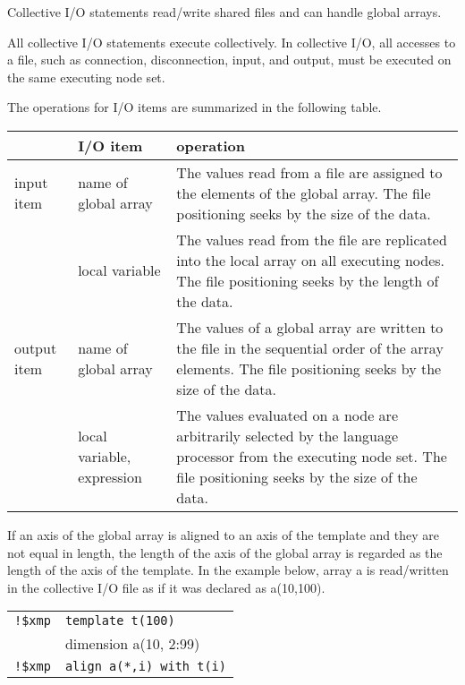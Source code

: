    Collective I/O statements read/write shared files and can handle global arrays.

   All collective I/O statements execute collectively.
   In collective I/O, all accesses to a file, such as connection, disconnection,
   input, and output, must be executed on the same executing node set. 
   
   The operations for I/O items are summarized in the following table.

   \begin{table}[h]
    \begin{center}
     \begin{tabular}{|p{10mm}|l|p{100mm}|}
      \hline
      \multicolumn{1}{|c}{ }  & {\bf I/O item} & {\bf operation} \\ \hline
      input item & name of global array & The values read from a file are assigned to the elements of the global array.
      The file positioning seeks by the size of the data.
      \\ \cline{2-3}
      & local variable &  The values read from the file are replicated into the
	      local array on all executing nodes. The file positioning seeks by
	      the length of the data.
      \\ \hline
      output item & name of global array & The values of a global array are
      written to the file in the sequential order of the array elements.
      The file positioning seeks by the size of the data.
      \\ \cline{2-3}
      & local variable, expression & The values evaluated on a node
			   are arbitrarily selected by the language processor from the
			   executing node set.
      The file positioning seeks by the size of the data.
      \\ \hline
      \end{tabular}
     \end{center}
    \label{tb:aaa}
   \end{table}

   If an axis of the global array is aligned to an axis of the template
   and they are not equal in length, the length of the axis of the
   global array is regarded as the length of the axis of the
   template. In the example below, array a is read/written in the
   collective I/O file as if it was declared as a(10,100).\\
   \begin{tabular}{ll}
     \verb|!$xmp| & \verb|template t(100)| \\
     & dimension a(10, 2:99) \\
     \verb|!$xmp| & \verb|align a(*,i) with t(i)| \\
   \end{tabular}
\fi
   
